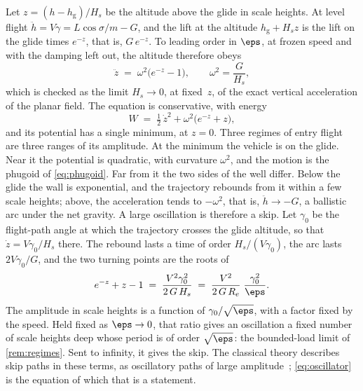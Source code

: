 Let $z = (h - h_{\mathrm{g}})/H_s$ be the altitude above the glide in scale
heights. At level flight $\ddot h = V\dot\gamma = L\cos\sigma/m - G$, and
the lift at the altitude $h_{\mathrm{g}} + H_s z$ is the lift on the glide
times $e^{-z}$, that is, $G\,e^{-z}$. To leading order in $\eps$, at frozen
speed and with the damping left out, the altitude therefore obeys
\begin{equation}\label{eq:oscillator}
  \ddot z \;=\; \omega^2\bigl(e^{-z} - 1\bigr),
  \qquad \omega^2 = \frac{G}{H_s} ,
\end{equation}
which is checked as the limit $H_s\to 0$, at fixed~$z$, of the exact
vertical acceleration of the planar field. The equation is conservative,
with energy
\[
  W \;=\; \tfrac12\,\dot z^2 + \omega^2\bigl(e^{-z} + z\bigr) ,
\]
and its potential has a single minimum, at $z = 0$. Three regimes of entry
flight are three ranges of its amplitude. At the minimum the vehicle is on
the glide. Near it the potential is quadratic, with curvature $\omega^2$,
and the motion is the phugoid of \cref{eq:phugoid}. Far from it the two
sides of the well differ. Below the glide the wall is exponential, and the
trajectory rebounds from it within a few scale heights; above, the
acceleration tends to $-\omega^2$, that is, $\ddot h\to -G$, a ballistic
arc under the net gravity. A large oscillation is therefore a skip. Let
$\gamma_0$ be the flight-path angle at which the trajectory crosses the
glide altitude, so that $\dot z = V\gamma_0/H_s$ there. The rebound lasts a
time of order $H_s/(V\gamma_0)$, the arc lasts $2V\gamma_0/G$, and the two
turning points are the roots of
\begin{equation}\label{eq:amplitude}
  e^{-z} + z - 1 \;=\; \frac{V^2\gamma_0^2}{2\,G\,H_s}
  \;=\; \frac{V^2}{2\,G\,R_e}\;\frac{\gamma_0^2}{\eps} .
\end{equation}
The amplitude in scale heights is a function of $\gamma_0/\sqrt{\eps}$,
with a factor fixed by the speed. Held fixed as $\eps\to 0$, that ratio
gives an oscillation a fixed number of scale heights deep whose period is
of order $\sqrt{\eps}$: the bounded-load limit of \cref{rem:regimes}. Sent
to infinity, it gives the skip. The classical theory describes skip paths
in these terms, as oscillatory paths of large amplitude~\cite{shi1971skip};
\cref{eq:oscillator} is the equation of which that is a statement.

